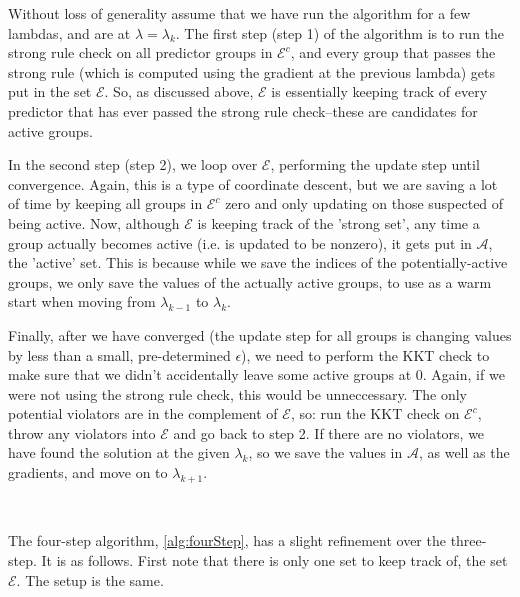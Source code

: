 \documentclass[12pt]{article}
\begin{document}
Without loss of generality assume that we have run the algorithm for a few lambdas, and are at $\lambda = \lambda_{k}$. The first step (step 1) of the algorithm is to run the strong rule check on all predictor groups in $\mathcal{E}^c$, and every group that passes the strong rule (which is computed using the gradient at the previous lambda) gets put in the set $\mathcal{E}$. So, as discussed above, $\mathcal{E}$ is essentially keeping track of every predictor that has ever passed the strong rule check--these are candidates for active groups.

In the second step (step 2), we loop over $\mathcal{E}$, performing the update step until convergence. Again, this is a type of coordinate descent, but we are saving a lot of time by keeping all groups in $\mathcal{E}^c$ zero and only updating on those suspected of being active. Now, although $\mathcal{E}$ is keeping track of the 'strong set', any time a group actually becomes active (i.e. is updated to be nonzero), it gets put in $\mathcal{A}$, the 'active' set. This is because while we save the indices of the potentially-active groups, we only save the values of the actually active groups, to use as a warm start when moving from $\lambda_{k-1}$ to $\lambda_k$.

Finally, after we have converged (the update step for all groups is changing values by less than a small, pre-determined $\epsilon$), we need to perform the KKT check to make sure that we didn't accidentally leave some active groups at 0. Again, if we were not using the strong rule check, this would be unneccessary. The only potential violators are in the complement of $\mathcal{E}$, so: run the KKT check on $\mathcal{E}^c$, throw any violators into $\mathcal{E}$ and go back to step 2. If there are no violators, we have found the solution at the given $\lambda_k$, so we save the values in $\mathcal{A}$, as well as the gradients, and move on to $\lambda_{k+1}$.

\

The four-step algorithm, \autoref{alg:fourStep}, has a slight refinement over the three-step. It is as follows. First note that there is only one set to keep track of, the set $\mathcal{E}$. The setup is the same.
\end{document}
